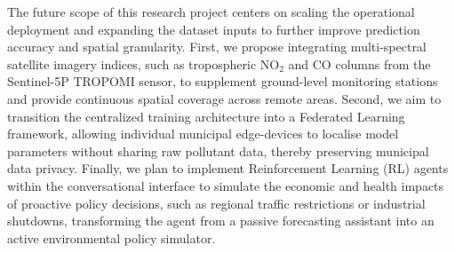 \documentclass[conference]{IEEEtran}
\begin{document}
The future scope of this research project centers on scaling the operational deployment and expanding the dataset inputs to further improve prediction accuracy and spatial granularity. First, we propose integrating multi-spectral satellite imagery indices, such as tropospheric $\text{NO}_2$ and $\text{CO}$ columns from the Sentinel-5P TROPOMI sensor, to supplement ground-level monitoring stations and provide continuous spatial coverage across remote areas. Second, we aim to transition the centralized training architecture into a Federated Learning framework, allowing individual municipal edge-devices to localise model parameters without sharing raw pollutant data, thereby preserving municipal data privacy. Finally, we plan to implement Reinforcement Learning (RL) agents within the conversational interface to simulate the economic and health impacts of proactive policy decisions, such as regional traffic restrictions or industrial shutdowns, transforming the agent from a passive forecasting assistant into an active environmental policy simulator.
\end{document}
